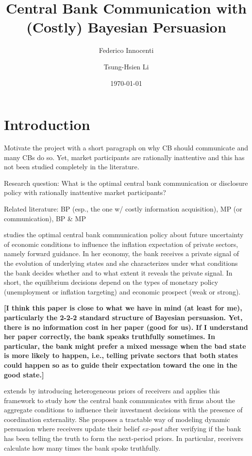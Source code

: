 \documentclass[12pt,a4paper]{article}
\title{Central Bank Communication with (Costly) Bayesian Persuasion}
\author{Federico Innocenti \and Tsung-Hsien Li}
\date{\today}
\begin{document}
\setlength{\parskip}{2mm}

\maketitle

\section{Introduction}

Motivate the project with a short paragraph on why CB should communicate and many CBs do so. Yet, market participants are rationally inattentive and this has not been studied completely in the literature.

Research question: What is the optimal central bank communication or disclosure policy with rationally inattentive market participants?

Related literature: BP (esp., the one w/ costly information acquisition), MP (or communication), BP \& MP

\cite{Ko2022} studies the optimal central bank communication policy about future uncertainty of economic conditions to influence the inflation expectation of private sectors, namely forward guidance. In her economy, the bank receives a private signal of the evolution of underlying states and she characterizes under what conditions the bank decides whether and to what extent it reveals the private signal. In short, the equilibrium decisions depend on the types of monetary policy (unemployment or inflation targeting) and economic prospect (weak or strong). 

\textbf{[I think this paper is close to what we have in mind (at least for me), particularly the 2-2-2 standard structure of Bayesian persuasion. Yet, there is no information cost in her paper (good for us). If I understand her paper correctly, the bank speaks truthfully sometimes. In particular, the bank might prefer a mixed message when the bad state is more likely to happen, i.e., telling private sectors that both states could happen so as to guide their expectation toward the one in the good state.]}

\cite{Herbert2021} extends \cite{KG2011} by introducing heterogeneous priors of receivers and applies this framework to study how the central bank communicates with firms about the aggregate conditions to influence their investment decisions with the presence of coordination externality. She proposes a tractable way of modeling dynamic persuasion where receivers update their belief \textit{ex-post} after verifying if the bank has been telling the truth to form the next-period priors. In particular, receivers calculate how many times the bank spoke truthfully.
\end{document}
